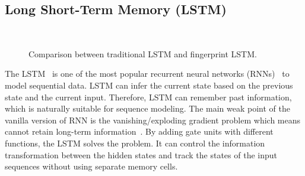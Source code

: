 \subsection{Long Short-Term Memory (LSTM)}
\begin{figure}[htbp]
	\centering
	\\
	\caption{Comparison between traditional LSTM and fingerprint LSTM.}
	\label{fig:LSTM}
\end{figure}
The LSTM~\cite{hochreiter1997long} is one of the most popular recurrent neural networks (RNNs)~\cite{mandic2001recurrent} to model sequential data. 
LSTM can infer the current state based on the previous state and the current input. 
Therefore, LSTM can remember past information, which is naturally suitable for sequence modeling. 
The main weak point of the vanilla version of RNN is the vanishing/exploding gradient problem which means cannot retain long-term information~\cite{bengio1994learning}. 
By adding gate units with different functions, the LSTM solves the problem. 
It can control the information transformation between the hidden states and track the states of the input sequences without using separate memory cells. 

